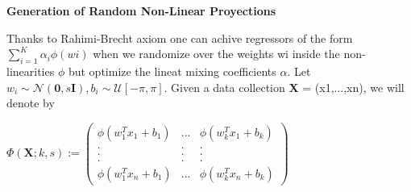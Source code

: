 \documentclass[11pt,twoside,a4paper]{article}
\begin{document}
\begin{flushleft}
\textbf{Generation of Random Non-Linear Proyections}

Thanks to Rahimi-Brecht axiom one can achive regressors of the form $\sum_{i=1}^{K} \alpha_{i}\phi(wi)$ when we randomize over the weights wi inside the non-linearities $\phi$ but optimize the lineat mixing coefficients $\alpha$.
Let $w_{i}\sim \mathcal{N}(\textbf{0}, s\textbf{I}), b_{i}\sim\mathcal{U}[-\pi,\pi].$
Given a data collection \textbf{X} = (x\small{1},...,x\small{n}), we will denote by
\end{flushleft}
$\Phi(\textbf{X};k,s):=
\left(\begin{array}{ccc} \phi(w_{1}^{T}x_{1} + b_{1})	&	...	&	\phi(w_{k}^{T}x_{1} + b_{k}) \\
. & . & . \\
. & . & . \\
. & . & .\\
\phi(w_{1}^{T}x_{n} + b_{1}) & ... & \phi(w_{k}^{T}x_{n} + b_{k}) \end{array}\right)$
\end{document}
